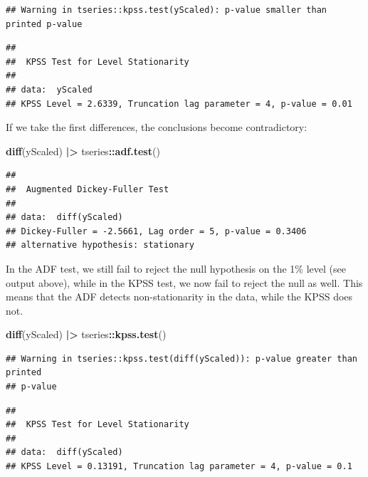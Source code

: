 \documentclass[
]{book}
\newenvironment{Shaded}{\begin{snugshade}}{\end{snugshade}}
\newcommand{\ErrorTok}[1]{\textcolor[rgb]{0.64,0.00,0.00}{\textbf{#1}}}
\newcommand{\KeywordTok}[1]{\textcolor[rgb]{0.13,0.29,0.53}{\textbf{#1}}}
\newcommand{\NormalTok}[1]{#1}
\newcommand{\OperatorTok}[1]{\textcolor[rgb]{0.81,0.36,0.00}{\textbf{#1}}}
\newcommand{\StringTok}[1]{\textcolor[rgb]{0.31,0.60,0.02}{#1}}
\begin{document}
\begin{verbatim}
## Warning in tseries::kpss.test(yScaled): p-value smaller than printed p-value
\end{verbatim}

\begin{verbatim}
## 
##  KPSS Test for Level Stationarity
## 
## data:  yScaled
## KPSS Level = 2.6339, Truncation lag parameter = 4, p-value = 0.01
\end{verbatim}

If we take the first differences, the conclusions become contradictory:

\begin{Shaded}
\begin{Highlighting}[]
\KeywordTok{diff}\NormalTok{(yScaled) }\OperatorTok{|}\ErrorTok{\textgreater{}}
\StringTok{    }\NormalTok{tseries}\OperatorTok{::}\KeywordTok{adf.test}\NormalTok{()}
\end{Highlighting}
\end{Shaded}

\begin{verbatim}
## 
##  Augmented Dickey-Fuller Test
## 
## data:  diff(yScaled)
## Dickey-Fuller = -2.5661, Lag order = 5, p-value = 0.3406
## alternative hypothesis: stationary
\end{verbatim}

In the ADF test, we still fail to reject the null hypothesis on the 1\% level (see output above), while in the KPSS test, we now fail to reject the null as well. This means that the ADF detects non-stationarity in the data, while the KPSS does not.

\begin{Shaded}
\begin{Highlighting}[]
\KeywordTok{diff}\NormalTok{(yScaled) }\OperatorTok{|}\ErrorTok{\textgreater{}}
\StringTok{    }\NormalTok{tseries}\OperatorTok{::}\KeywordTok{kpss.test}\NormalTok{()}
\end{Highlighting}
\end{Shaded}

\begin{verbatim}
## Warning in tseries::kpss.test(diff(yScaled)): p-value greater than printed
## p-value
\end{verbatim}

\begin{verbatim}
## 
##  KPSS Test for Level Stationarity
## 
## data:  diff(yScaled)
## KPSS Level = 0.13191, Truncation lag parameter = 4, p-value = 0.1
\end{verbatim}
\end{document}
